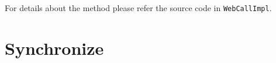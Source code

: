 For details about the method please refer the source code in \texttt{WebCallImpl}.

\section{Synchronize}

